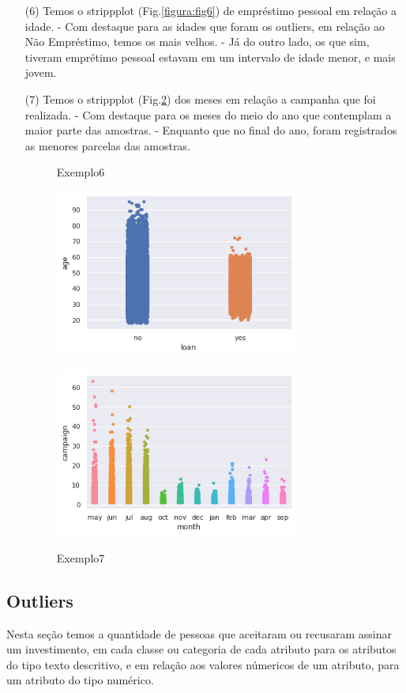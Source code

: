 \documentclass[conference]{IEEEtran}
\begin{document}
\begin{itemize}
\begin{figure}[h]
		\label{figura:fig5}
	\end{figure}
	\item[(6)] Temos o strippplot (Fig.\ref{figura:fig6}) de empréstimo pessoal em relação a idade.
	\subitem-		Com destaque para as idades que foram os outliers, em relação ao Não Empréstimo, temos os mais velhos.
	\subitem-		Já do outro lado, os que sim, tiveram emprétimo pessoal estavam em um intervalo de idade menor, e mais jovem.
	\item[(7)] Temos o strippplot (Fig.\ref{figura:fig7}) dos meses em relação a campanha que foi realizada.
	\subitem-		Com destaque para os meses do meio do ano que contemplam a maior parte das amostras.
	\subitem-		Enquanto que no final do ano, foram registrados as menores parcelas das amostras.
	\begin{figure}[h]
		\caption{Exemplo6}
		\centering %
		\includegraphics[width=8cm]{IMGS/img6.png}
		\label{figura:fig6}
		\caption{Exemplo7}
		\includegraphics[width=8cm]{IMGS/img7.png}
		\label{figura:fig7}
	\end{figure}
\end{itemize}
\subsection{Outliers}
Nesta seção temos a quantidade de pessoas que aceitaram ou recusaram assinar um investimento, em cada classe ou categoria de cada atributo para os atributos do tipo texto descritivo, e em relação aos valores númericos de um atributo, para um atributo do tipo numérico. 
\end{document}
